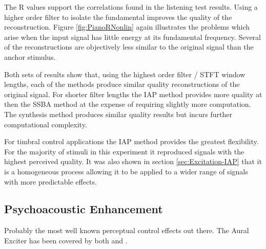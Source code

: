 		The R values support the correlations found in the listening test results. Using a higher order
		filter to isolate the fundamental improves the quality of the reconstruction. Figure \ref{fig:PianoRNonlin}
		again illustrates the problems which arise when the input signal has little energy at its fundamental
		frequency. Several of the reconstructions are objectively less similar to the original signal than the
		anchor stimulus.

		Both sets of results show that, using the highest order filter / STFT window lengths, each of the methods
		produce similar quality reconstructions of the original signal. For shorter filter lengths the IAP method
		provides more quality at then the SSBA method at the expense of requiring slightly more computation. The
		synthesis method produces similar quality results but incurs further computational complexity. 
		
		For timbral control applications the IAP method provides the greatest flexibility. For the majority of
		stimuli in this experiment it reproduced signals with the highest perceived quality. It was also shown in
		section \ref{sec:Excitation-IAP} that it is a homogeneous process allowing it to be applied to a wider
		range of signals with more predictable effects.

	\subsection{Psychoacoustic Enhancement}
	\label{sec:Excitation-Enhancement}
	
		\note
		{
			Probably the most well known perceptual control effects out there. The Aural Exciter has been 
			covered by both \citet{chalupper2000aural} and \citet{shekar2013modeling}.
		}

